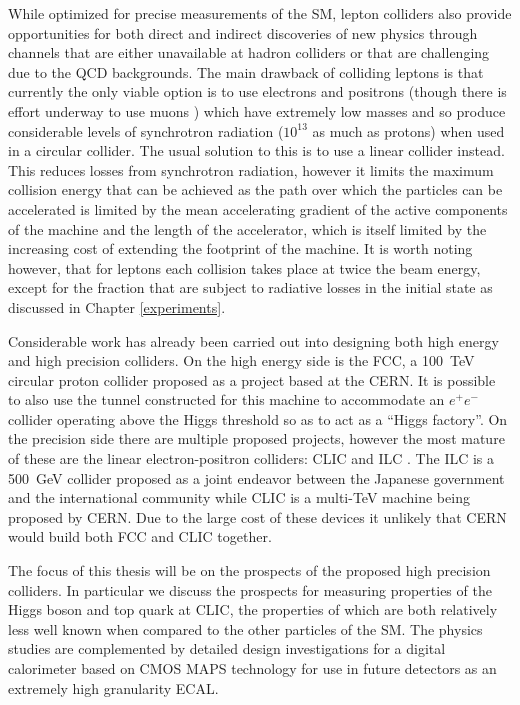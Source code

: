 While optimized for precise measurements of the \ac{SM}, lepton colliders also provide opportunities for both direct and indirect discoveries of new physics through channels that are either unavailable at hadron colliders or that are challenging due to the \ac{QCD} backgrounds. The main drawback of colliding leptons is that currently the only viable option is to use electrons and positrons (though there is effort underway to use muons \cite{Bogomilov:2017vwz}) which have extremely low masses and so produce considerable levels of synchrotron radiation (${10^{13}}$ as much as protons) when used in a circular collider. The usual solution to this is to use a linear collider instead. This reduces losses from synchrotron radiation, however it limits the maximum collision energy that can be achieved as the path over which the particles can be accelerated is limited by the mean accelerating gradient of the active components of the machine and the length of the accelerator, which is itself limited by the increasing cost of extending the footprint of the machine. It is worth noting however, that for leptons each collision takes place at twice the beam energy, except for the fraction that are subject to radiative losses in the initial state as discussed in Chapter \ref{experiments}.

Considerable work has already been carried out into designing both high energy and high precision colliders. On the high energy side is the \ac{FCC}, a 100~TeV circular proton collider proposed as a project based at the \ac{CERN}. It is possible to also use the tunnel constructed for this machine to accommodate an $e^+e^-$ collider operating above the Higgs threshold so as to act as a ``Higgs factory''. On the precision side there are multiple proposed projects, however the most mature of these are the linear electron-positron colliders: \ac{CLIC} \cite{CLIC:2016zwp} and \ac{ILC} \cite{ILCTDR}. The \ac{ILC} is a 500~GeV collider proposed as a joint endeavor between the Japanese government and the international community while \ac{CLIC} is a multi-TeV machine being proposed by \ac{CERN}. Due to the large cost of these devices it unlikely that \ac{CERN} would build both \ac{FCC} and \ac{CLIC} together.

The focus of this thesis will be on the prospects of the proposed high precision colliders. In particular we discuss the prospects for measuring properties of the Higgs boson and top quark at \ac{CLIC}, the properties of which are both relatively less well known when compared to the other particles of the \ac{SM}. The physics studies are complemented by detailed design investigations for a digital calorimeter based on \ac{CMOS} \ac{MAPS} technology for use in future detectors as an extremely high granularity \ac{ECAL}.  


 
